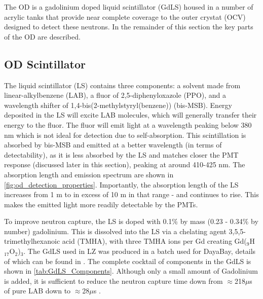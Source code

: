 \par
The OD is a gadolinium doped liquid scintillator (GdLS) housed in a number of acrylic tanks that provide near complete coverage to the outer crystat (OCV) designed to detect these neutrons.
In the remainder of this section the key parts of the OD are described.



\subsection{OD Scintillator}
\par
The liquid scintillator (LS) contains three components: a solvent made from linear-alkylbenzene (LAB), a fluor of 2,5-diphenyloxazole (PPO), and a wavelength shifter of 1,4-bis(2-methylstyryl(benzene)) (bis-MSB).
Energy deposited in the LS will excite LAB molecules, which will generally transfer their energy to the fluor. 
The fluor will emit light at a wavelength peaking below 380 nm which is not ideal for detection due to self-absorption.
This scintillation is absorbed by bis-MSB and emitted at a better wavelength (in terms of detectability), as it is less absorbed by the LS and matches closer the PMT response (discussed later in this section), peaking at around 410-425 nm.
The absorption length and emission spectrum are shown in \autoref{fig:od_detection_properties}.
Importantly, the absorption length of the LS increases from 1 m to in excess of 10 m in that range - and continues to rise.
This makes the emitted light more readily detectable by the PMTs.



\par
To improve neutron capture, the LS is doped with 0.1\% by mass (0.23 - 0.34\% by number) gadolinium.
This is dissolved into the LS via a chelating agent 3,5,5-trimethylhexanoic acid (TMHA), with three TMHA ions per Gd creating Gd(${}_{9}$H${}_{17}$O${}_{2}$)${}_{3}$.
The GdLS used in LZ was produced in a batch used for DayaBay, details of which can be found in \cite{dayabay_gd_doping_ref}.
The complete cocktail of components in the GdLS is shown in \autoref{tab:GdLS_Components}.
Although only a small amount of Gadolinium is added, it is sufficient to reduce the neutron capture time down from $\approx$218$\mu$s of pure LAB down to $\approx$28$\mu$s \cite{ucsb_gdls_dicebox_simulations_ref}.

